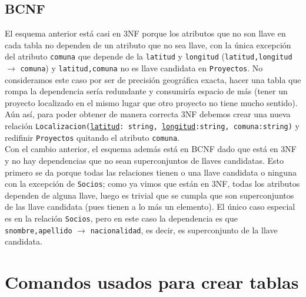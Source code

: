 \documentclass{article}
\begin{document}
\subsection{BCNF}
	El esquema anterior está casi en 3NF porque los atributos que no son llave en cada tabla no dependen de un atributo que no sea llave, con la única excepción del atributo \texttt{comuna} que depende de la \texttt{latitud} y \texttt{longitud} (\texttt{latitud,longitud} $\rightarrow$ \texttt{comuna}) y \texttt{latitud,comuna} no es llave candidata en \texttt{Proyectos}. No consideramos este caso por ser de precisión geográfica exacta, hacer una tabla que rompa la dependencia sería redundante y consumiría espacio de más (tener un proyecto localizado en el mismo lugar que otro proyecto no tiene mucho sentido). Aún así, para poder obtener de manera correcta 3NF debemos crear una nueva relación \texttt{Localizacion(\underline{latitud}: string, \underline{longitud}:string, comuna:string)} y redifinir \texttt{Proyectos} quitando el atributo \texttt{comuna}.\\

	Con el cambio anterior, el esquema además está en BCNF dado que está en 3NF y no hay dependencias que no sean superconjuntos de llaves candidatas. Esto primero se da porque todas las relaciones tienen o una llave candidata o ninguna con la excepción de \texttt{Socios}; como ya vimos que están en 3NF, todas los atributos dependen de alguna  llave, luego es trivial que se cumpla que son superconjuntos de las llave candidata (pues tienen a lo más un elemento). El único caso especial es en la relación \texttt{Socios}, pero en este caso la dependencia es que \texttt{snombre,apellido} $\rightarrow$ \texttt{nacionalidad}, es decir, es superconjunto de la llave candidata. 

\section{Comandos usados para crear tablas}
\end{document}
